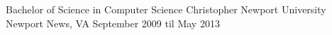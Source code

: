 

\begin{cventries}

  \cventry
    {Bachelor of Science in Computer Science} %
    {Christopher Newport University} %
    {Newport News, VA} %
    {September 2009 til May 2013} %
    {
    }
\end{cventries}
